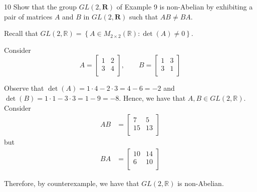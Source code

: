 \begin{hwproblem}
{10}{
    Show that the group $G L(2, \mathbf{R})$ of Example 9 is non-Abelian by exhibiting a pair of matrices $A$ and $B$ in $G L(2, \mathbf{R})$ such that $A B \neq B A$.
}

Recall that \(GL(2, \mathbb{R}) = \left\{A \in M_{2 \times 2}(\mathbb{R}) : \det(A) \neq 0\right\}\).

Consider
\[
A = 
\begin{bmatrix}
    1 & 2 \\
    3 & 4 \\
\end{bmatrix}, \qquad
B = 
\begin{bmatrix}
    1 & 3 \\
    3 & 1 \\
\end{bmatrix}
\]

Observe that \(\det(A) = 1 \cdot 4 - 2 \cdot 3 = 4 - 6 = -2\) and \(\det(B) = 1 \cdot 1 - 3 \cdot 3 = 1 - 9 = -8\). Hence, we have that \(A, B \in GL(2, \mathbb{R})\). Consider
\[
\begin{aligned}
    AB &= \begin{bmatrix}
        7 & 5 \\
        15 & 13 \\
    \end{bmatrix}
\end{aligned}
\]
but
\[
\begin{aligned}
    BA &= \begin{bmatrix}
        10 & 14 \\
        6 & 10 \\
    \end{bmatrix}
\end{aligned}
\]

Therefore, by counterexample, we have that \(GL(2, \mathbb{R})\) is non-Abelian.
\end{hwproblem}

